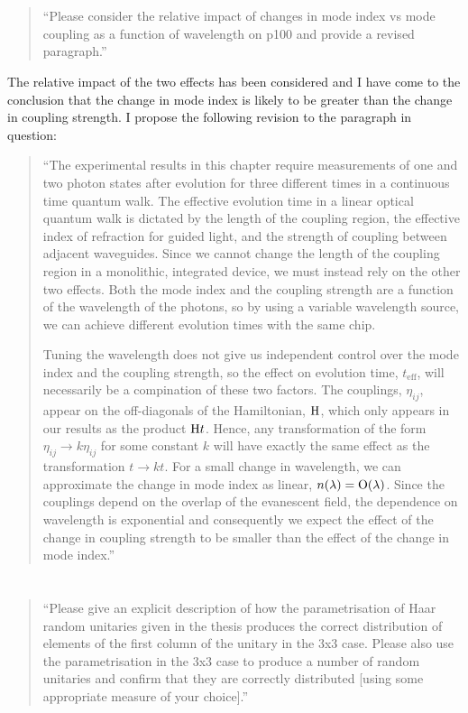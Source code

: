 \documentclass[a4paper,11pt]{article}
\begin{document}
\section{}
\begin{quote}
  ``Please consider the relative impact of changes in mode index vs
  mode coupling as a function of wavelength on p100 and provide a
  revised paragraph.''
\end{quote}
The relative impact of the two effects has been considered and I have come to
the conclusion that the change in mode index is likely to be greater than the
change in coupling strength. I propose the following revision to the paragraph
in question:
\begin{quote}
  ``The experimental results in this chapter require measurements of one and two
  photon states after evolution for three different times in a continuous time
  quantum walk. The effective evolution time in a linear optical quantum walk is
  dictated by the length of the coupling region, the effective index of
  refraction for guided light, and the strength of coupling between adjacent
  waveguides. Since we cannot change the length of the coupling region in a
  monolithic, integrated device, we must instead rely on the other two effects.
  Both the mode index and the coupling strength are a function of the wavelength
  of the photons, so by using a variable wavelength source, we can achieve
  different evolution times with the same chip.

  Tuning the wavelength does not give us independent control over the mode index
  and the coupling strength, so the effect on evolution time,
  \(t_{\text{eff}}\), will necessarily be a compination of these two factors.
  The couplings, \(\eta_{ij}\), appear on the off-diagonals of the Hamiltonian,
  \(\mathrm{H}\), which only appears in our results as the product \(\mathrm{H} t\).
  Hence, any transformation of the form \(\eta_{ij} \rightarrow k \eta_{ij}\)
  for some constant \(k\) will have exactly the same effect as the
  transformation \(t \rightarrow k t\). For a small change in wavelength, we
  can approximate the change in mode index as linear, \(n \!\left(\lambda\right) = \mathrm{O}
  \!\left(\lambda\right)\). Since the couplings depend on the overlap of the evanescent
  field, the dependence on wavelength is exponential and consequently we expect
  the effect of the change in coupling strength to be smaller than the effect of
  the change in mode index.''
\end{quote}

\section{}
\begin{quote}
  ``Please give an explicit description of how the parametrisation of
  Haar random unitaries given in the thesis produces the correct
  distribution of elements of the first column of the unitary in the 3x3
  case.  Please also use the parametrisation in the 3x3 case to produce
  a number of random unitaries and confirm that they are correctly
  distributed [using some appropriate measure of your choice].''
\end{quote}
\end{document}
